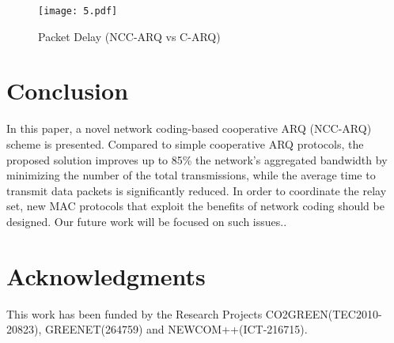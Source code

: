 \documentclass[conference]{IEEEtran}
\begin{document}
\begin{figure}[htb]
\centering
\texttt{[image: 5.pdf]}
\caption{Packet Delay (NCC-ARQ vs C-ARQ)}\label{f5}
\end{figure}

\section{Conclusion}
\label{sec:conclusion}

In this paper, a novel network coding-based cooperative ARQ (NCC-ARQ) scheme is presented. Compared to simple cooperative ARQ protocols, the proposed solution improves up to 85\% the network's aggregated bandwidth by minimizing the number of the total transmissions, while the average time to transmit data packets is significantly reduced. In order to coordinate the relay set, new MAC protocols that exploit the benefits of network coding should be designed. Our future work will be focused on such issues..

\section*{Acknowledgments}

This work has been funded by the Research Projects CO2GREEN(TEC2010-20823), GREENET(264759) and NEWCOM++(ICT-216715).

\ifCLASSOPTIONcaptionsoff
  \newpage
\fi
\end{document}
